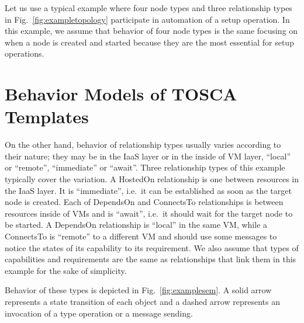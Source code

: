 \documentclass[12pt]{report}
\begin{document}
Let us use a typical example where four node types and three
relationship types in Fig.~\ref{fig:exampletopology} participate in
automation of a setup operation. In this example, we assume that
behavior of four node types is the same focusing on when a node is
created and started because they are the most essential for setup
operations.

\section{Behavior Models of TOSCA Templates}
\label{sec:TOSCAbehavior}
On the other hand, behavior of relationship types usually varies
according to their nature; they may be in the IaaS layer or in the
inside of VM layer, ``local'' or ``remote'', ``immediate'' or
``await''. Three relationship types of this example typically cover
the variation. A HostedOn relationship is one between resources in the
IaaS layer.  It is ``immediate'', i.e.\ it can be established as soon
as the target node is created.  Each of DependsOn and ConnectsTo
relationships is between resources inside of VMs and is ``await'',
i.e.\ it should wait for the target node to be started. A DependsOn
relationship is ``local'' in the same VM, while a ConnectsTo is
``remote'' to a different VM and should use some messages to notice
the states of its capability to its requirement.  We also assume that
types of capabilities and requirements are the same as relationships
that link them in this example for the sake of simplicity.

Behavior of these types is depicted in Fig.~\ref{fig:examplesem}.  A
solid arrow represents a state transition of each object and a dashed
arrow represents an invocation of a type operation or a message
sending.
\end{document}

